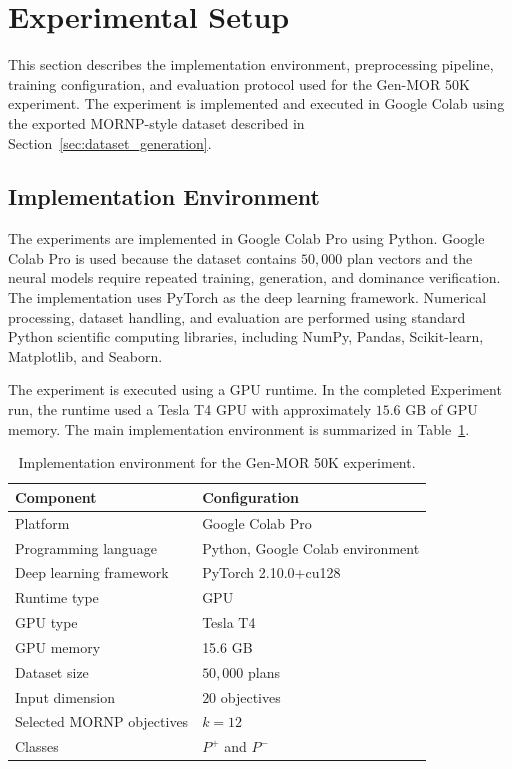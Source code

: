 \section{Experimental Setup}
\label{sec:experimental_setup}

This section describes the implementation environment, preprocessing pipeline, training configuration, and evaluation protocol used for the Gen-MOR 50K experiment. The experiment is implemented and executed in Google Colab using the exported MORNP-style dataset described in Section~\ref{sec:dataset_generation}.

\subsection{Implementation Environment}
\label{subsec:implementation_environment}

The experiments are implemented in Google Colab Pro using Python. Google Colab Pro is used because the dataset contains $50{,}000$ plan vectors and the neural models require repeated training, generation, and dominance verification. The implementation uses PyTorch as the deep learning framework. Numerical processing, dataset handling, and evaluation are performed using standard Python scientific computing libraries, including NumPy, Pandas, Scikit-learn, Matplotlib, and Seaborn.

The experiment is executed using a GPU runtime. In the completed Experiment run, the runtime used a Tesla T4 GPU with approximately $15.6$ GB of GPU memory. The main implementation environment is summarized in Table~\ref{tab:implementation_environment}.

\begin{table}[H]
\centering
\caption{Implementation environment for the Gen-MOR 50K experiment.}
\label{tab:implementation_environment}
\begin{tabularx}{\textwidth}{lX}
\hline
\textbf{Component} & \textbf{Configuration} \\
\hline
Platform & Google Colab Pro \\
Programming language & Python, Google Colab environment \\
Deep learning framework & PyTorch 2.10.0+cu128 \\
Runtime type & GPU \\
GPU type & Tesla T4 \\
GPU memory & 15.6 GB \\
Dataset size & $50{,}000$ plans \\
Input dimension & $20$ objectives \\
Selected MORNP objectives & $k=12$ \\
Classes & $P^{+}$ and $P^{-}$ \\
\hline
\end{tabularx}
\end{table}

